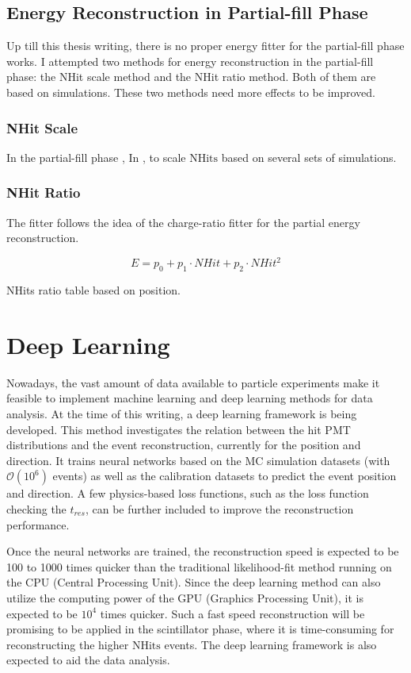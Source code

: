 \subsection{Energy Reconstruction in Partial-fill Phase}
Up till this thesis writing, there is no proper energy fitter for the partial-fill phase works. I attempted two methods for energy reconstruction in the partial-fill phase: the NHit scale method and the NHit ratio method. Both of them are based on simulations. These two methods need more effects to be improved.
\subsubsection{NHit Scale}
In the partial-fill phase ,  In \cite{partialEnergy}, 
to scale $\mathrm{NHits}$ based on several sets of simulations.

\subsubsection{NHit Ratio}

The fitter follows the idea of the charge-ratio fitter for the partial energy reconstruction\cite{partialEnergyYang}.

\begin{equation}
E = p_0+p_1\cdot NHit+p_2\cdot NHit^2
\end{equation}

NHits ratio table based on position.

\section{Deep Learning}
Nowadays, the vast amount of data available to particle experiments make it feasible to implement machine learning and deep learning methods for data analysis. At the time of this writing, a deep learning framework is being developed\cite{markMachineLearning,markNeuralTalk,markNeuralNetwork}. This method investigates the relation between the hit PMT distributions and the event reconstruction, currently for the position and direction. It trains neural networks based on the MC simulation datasets (with $\mathcal{O}(10^6)$ events) as well as the calibration datasets to predict the event position and direction\cite{markNeuralTalk}. A few physics-based loss functions, such as the loss function checking the $t_{res}$, can be further included to improve the reconstruction performance\cite{markNeuralTalk}. 

Once the neural networks are trained, the reconstruction speed is expected to be 100 to 1000 times quicker than the traditional likelihood-fit method running on the CPU (Central Processing Unit). Since the deep learning method can also utilize the computing power of the GPU (Graphics Processing Unit), it is expected to be $10^4$ times quicker\cite{markNeuralTalk,markNeuralNetwork}. Such a fast speed reconstruction will be promising to be applied in the scintillator phase, where it is time-consuming for reconstructing the higher $\mathrm{NHits}$ events. The deep learning framework is also expected to aid the data analysis.

